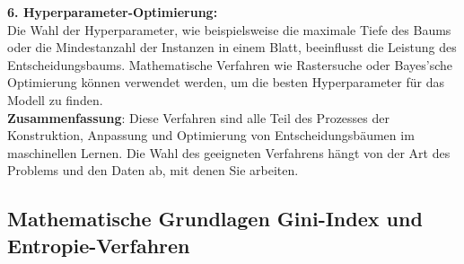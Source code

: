 \documentclass[12pt]{article}
\begin{document}
%
\textbf{6. Hyperparameter-Optimierung:}\\
Die Wahl der Hyperparameter, wie beispielsweise die maximale Tiefe des Baums oder die Mindestanzahl der Instanzen in einem Blatt, beeinflusst die Leistung des Entscheidungsbaums. Mathematische Verfahren wie Rastersuche oder Bayes'sche Optimierung können verwendet werden, um die besten Hyperparameter für das Modell zu finden.\\[0.2cm]
%
\textbf{Zusammenfassung}:
Diese Verfahren sind alle Teil des Prozesses der Konstruktion, Anpassung und Optimierung von Entscheidungsbäumen im maschinellen Lernen. Die Wahl des geeigneten Verfahrens hängt von der Art des Problems und den Daten ab, mit denen Sie arbeiten.\\[0.4cm]

\subsection{Mathematische Grundlagen Gini-Index und Entropie-Verfahren}
\end{document}
